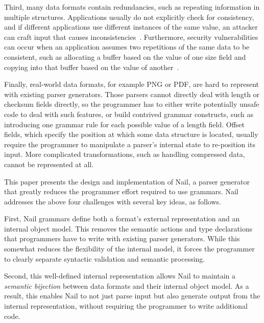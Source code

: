 Third, many data formats contain redundancies, such as repeating
information in multiple structures.  Applications usually do not
explicitly check for consistency, and if different applications use
different instances of the same value, an attacker can craft input that
causes inconsistencies~\cite{evaders6}.  Furthermore, security
vulnerabilities can occur when an application assumes two repetitions
of the same data to be consistent, such as allocating a buffer based on
the value of one size field and copying into that buffer based on the
value of another~\cite{cve-2012-7338}.

Finally, real-world data formats, for example PNG or PDF, are hard to
represent with existing parser generators.  Those parsers cannot directly
deal with length or checksum fields directly, so the programmer has to
either write potentially unsafe code to deal with such features, or build
contrived grammar constructs, such as introducing one grammar rule for
each possible value of a length field.  Offset fields, which specify
the position at which some data structure is located, usually require
the programmer to manipulate a parser's internal state to re-position
its input.  More complicated transformations, such as handling compressed
data, cannot be represented at all.



This paper presents the design and implementation of Nail, a parser generator that greatly reduces
the programmer effort required to use grammars. Nail addresses the above four challenges with
several key ideas, as follows.

First, Nail grammars define both a format's external representation and an internal object model.
This removes the semantic actions and type declarations that programmers have to write with existing
parser generators. While this somewhat reduces the flexibility of the internal model, it forces the programmer
to clearly separate syntactic validation and semantic processing.

Second, this well-defined internal representation allows Nail to
maintain a {\em semantic bijection} between data formats and their
internal object model.  As a result, this enables Nail to not just
parse input but also generate output from the internal representation,
without requiring the programmer to write additional code.



